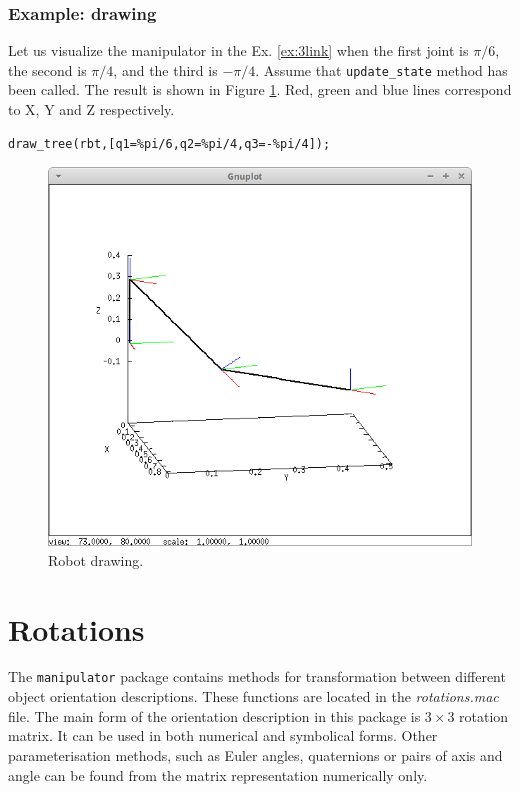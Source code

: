 \documentclass{article}
\begin{document}
\subsubsection{Example: drawing}

Let us visualize the manipulator in the Ex. \ref{ex:3link} when the first joint is $\pi/6$, the second is $\pi/4$, and the third is $-\pi/4$. Assume that \texttt{update\_state} method has been called. The result is shown in Figure \ref{fig:drawing}. Red, green and blue lines correspond to X, Y and Z respectively.
\begin{verbatim}
draw_tree(rbt,[q1=%pi/6,q2=%pi/4,q3=-%pi/4]);
\end{verbatim}

\begin{figure}[t]
    \centering
    \includegraphics[width=0.8\linewidth]{img/robot_state.png}
    \caption{Robot drawing.}
    \label{fig:drawing}
\end{figure}

\section{Rotations}

The \texttt{manipulator} package contains methods for transformation between different object orientation descriptions. These functions are located in the \textit{rotations.mac} file. The main form of the orientation description in this package is $3 \times 3$ rotation matrix. It can be used in both numerical and symbolical forms. Other parameterisation methods, such as Euler angles, quaternions or pairs of axis and angle can be found from the matrix representation numerically only.  
\end{document}
